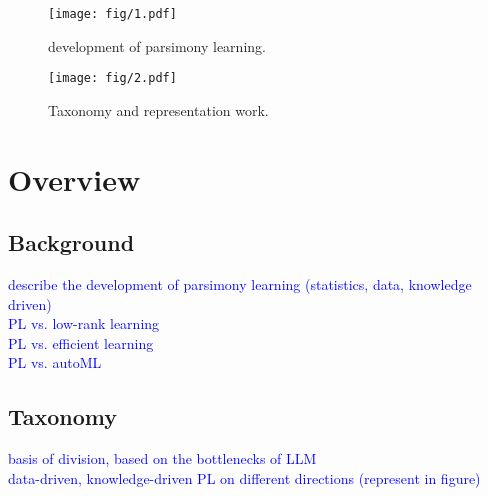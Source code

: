 \begin{figure}[t]
\centering
\texttt{[image: fig/1.pdf]}
\caption{development of parsimony learning.}
\label{fig1}
\end{figure}

\begin{figure*}[t]
\centering
\texttt{[image: fig/2.pdf]}
\caption{Taxonomy and representation work.}
\label{fig1}
\end{figure*}

\section{Overview}

\subsection{Background}
\textcolor{blue}{describe the development of parsimony learning  (statistics, data, knowledge driven)}\\
\textcolor{blue}{PL vs. low-rank learning}\\
\textcolor{blue}{PL vs. efficient learning}\\
\textcolor{blue}{PL vs. autoML}\\






\subsection{Taxonomy}
\textcolor{blue}{basis of division, based on the bottlenecks of LLM}\\
\textcolor{blue}{data-driven, knowledge-driven PL on different directions (represent in figure)}
